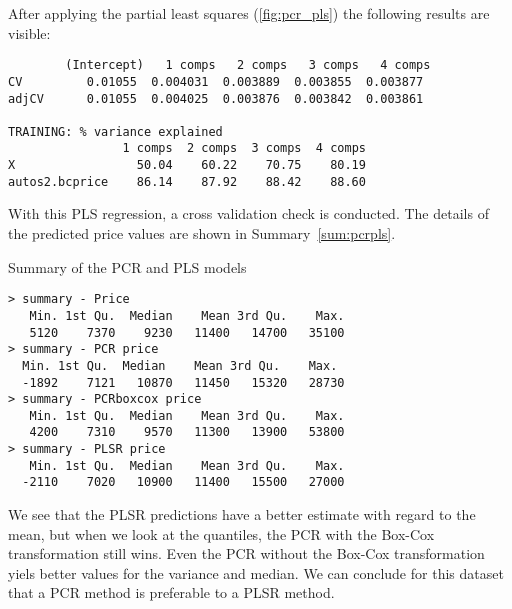 After applying the partial least squares (\autoref{fig:pcr_pls}) the following results are visible:
\begin{verbatim}
        (Intercept)   1 comps   2 comps   3 comps   4 comps
CV         0.01055  0.004031  0.003889  0.003855  0.003877
adjCV      0.01055  0.004025  0.003876  0.003842  0.003861

TRAINING: % variance explained
                1 comps  2 comps  3 comps  4 comps
X                 50.04    60.22    70.75    80.19
autos2.bcprice    86.14    87.92    88.42    88.60
\end{verbatim}
With this PLS regression, a cross validation check is conducted. The details of the predicted price values are shown in Summary~\ref{sum:pcrpls}.
\begin{summary}
\caption{Summary of the PCR and PLS models}
\label{sum:pcrpls}
\begin{verbatim}
> summary - Price
   Min. 1st Qu.  Median    Mean 3rd Qu.    Max.
   5120    7370    9230   11400   14700   35100
> summary - PCR price
  Min. 1st Qu.  Median    Mean 3rd Qu.    Max.
  -1892    7121   10870   11450   15320   28730
> summary - PCRboxcox price
   Min. 1st Qu.  Median    Mean 3rd Qu.    Max.
   4200    7310    9570   11300   13900   53800
> summary - PLSR price
   Min. 1st Qu.  Median    Mean 3rd Qu.    Max.
  -2110    7020   10900   11400   15500   27000
  \end{verbatim}
\end{summary}

We see that the PLSR predictions have a better estimate with regard to the mean, but when we look at the quantiles, the PCR with the Box-Cox transformation still wins. Even the PCR without the Box-Cox transformation yiels better values for the variance and median. We can conclude for this dataset that a PCR method is preferable to a PLSR method.

